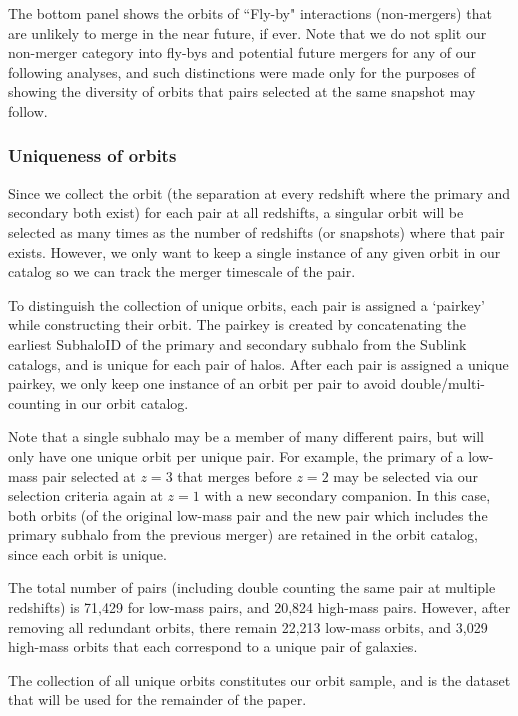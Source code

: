 \documentclass[twocolumn,linenumbers]{aastex631}
\begin{document}
The bottom panel shows the orbits of ``Fly-by" interactions (non-mergers) that are unlikely to merge in the near future, if ever.  
Note that we do not split our non-merger category into fly-bys and potential future mergers for any of our following analyses, and such distinctions were made only for the purposes of showing the diversity of orbits that pairs selected at the same snapshot may follow.


\subsubsection{Uniqueness of orbits}
\label{sec:methods-unique}
Since we collect the orbit (the separation at every redshift where the primary and secondary both exist) for each pair at all redshifts, a singular orbit will be selected as many times as the number of redshifts (or snapshots) where that pair exists. However, we only want to keep a single instance of any given orbit in our catalog so we can track the merger timescale of the pair.

To distinguish the collection of unique orbits, each pair is assigned a `pairkey' while constructing their orbit. 
The pairkey is created by concatenating the earliest SubhaloID of the primary and secondary subhalo from the Sublink catalogs, and is unique for each pair of halos. 
After each pair is assigned a unique pairkey, we only keep one instance of an orbit per pair to avoid double/multi-counting in our orbit catalog.

Note that a single subhalo may be a member of many different pairs, but will only have one unique orbit per unique pair.
For example, the primary of a low-mass pair selected at $z=3$ that merges before $z=2$ may be selected via our selection criteria again at $z=1$ with a new secondary companion. 
In this case, both orbits (of the original low-mass pair and the new pair which includes the primary subhalo from the previous merger) are retained in the orbit catalog, since each orbit is unique.

The total number of pairs (including double counting the same pair at multiple redshifts) is 71,429 for low-mass pairs, and 20,824 high-mass pairs. 
However, after removing all redundant orbits, there remain 22,213 low-mass orbits, and 3,029 high-mass orbits that each correspond to a unique pair of galaxies.

The collection of all unique orbits constitutes our orbit sample, and is the dataset that will be used for the remainder of the paper.
\end{document}

